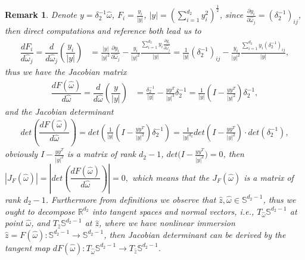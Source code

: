 \documentclass[11pt,reqno]{amsart}
\newtheorem{remark}{\indent Remark}[section]
\numberwithin{equation}{section}
\newcommand{\R}{\mathbb{R}}
\newcommand{\s}{\mathbb{S}}
\newcommand{\om}{\omega}
\newcommand{\de}{\delta}
\begin{document}
\begin{remark}\label{d-0}
Denote $y=\de_{2}^{-1}\hat{\om}$, $F_{i}=\frac{y_i}{|y|}$,  $|y|=\left(\sum_{i=1}^{d_2} y_i^{2}\right)^{\frac{1}{2}} $, since $ \frac{\partial y_i}{\partial \hat{\om}_j}=(\de^{-1}_{2})_{ij}$, then direct computations and reference \cite[199, 10.3.11-10.3.12]{KP}  both lead us to 
\begin{align*}
\dfrac{dF_i}{d\hat{\om}_j}=\dfrac{d}{d\hat{\om}_j}\left(\dfrac{y_i}{|y|} \right)&=\frac{|y|}{|y|^2}\frac{\partial y_i}{\partial \hat{\om}_j}-\frac{y_i}{|y|^2}\frac{\sum_{i=1}^{d_2} y_i \frac{\partial y_i}{\partial \hat{\om}_j}}{|y|}=\frac{1}{|y|}(\de^{-1}_{2})_{ij}-\frac{y_i}{|y|^2}\frac{\sum_{i=1}^{d_2} y_i (\de^{-1}_{2})_{ij}}{|y|},
\end{align*}
thus we have the Jacobian matrix 
\begin{align*}
\dfrac{dF(\hat{\om})}{d\hat{\om}}=\dfrac{d}{d\hat{\om}}\left(\dfrac{y}{|y|} \right)
&=\frac{\de^{-1}_{2}}{|y|}-\frac{yy^{T} }{|y|^3}\de^{-1}_{2}=\frac{1}{|y|}\left(I-\frac{yy^{T}}{|y|^2} \right)  \de^{-1}_{2},
\end{align*}
and the Jacobian determinant
\begin{align*}
 det\left( \dfrac{dF(\hat{\om})}{d\hat{\om}}\right) =det\left(\frac{1}{|y|}\left(I-\frac{yy^{T}}{|y|^2} \right) \de^{-1}_{2}\right) =\frac{1}{|y|^{d_2}}det\left(I-\frac{yy^{T}}{|y|^2} \right)  \cdot det( \de^{-1}_{2} ),
\end{align*}
 obviously $I-\frac{yy^{T}}{|y|^2}$ is a matrix of rank $d_2-1$, $det\big(I-\frac{yy^{T}}{|y|^2} \big)=0$, then $|J_{F}(\hat{\om})|=\left| det\left( \dfrac{dF(\hat{\om})}{d\hat{\om}}\right) \right|=0,$ which means that the $J_{F}(\hat{\om})$ is a matrix of rank $d_2-1$. Furthermore from definitions we observe that $\hat{z}, \hat{\om}\in\s^{d_2-1}$, thus we ought to decompose $\R^{d_2}$ into  tangent spaces and normal vectors, i.e., $T_{\hat{\om}}\s^{d_2-1}$ at point $\hat{\om}$, and $T_{\hat{z}}\s^{d_2-1}$ at $\hat{z}$, where we have nonlinear immersion $\hat{z}=F(\hat{\om}):\s^{d_2-1}\rightarrow \s^{d_2-1}$, then Jacobian determinant can be derived by the tangent map $dF({\hat{\om}}):T_{\hat{\om}}\s^{d_2-1}\rightarrow T_{\hat{z}}\s^{d_2-1}$.
\end{remark}
\end{document}
